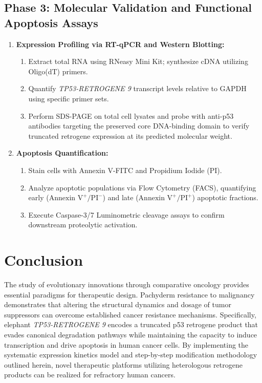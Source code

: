 \documentclass[12pt]{article}
\begin{document}
\subsection{Phase 3: Molecular Validation and Functional Apoptosis Assays}
\begin{enumerate}
    \item \textbf{Expression Profiling via RT-qPCR and Western Blotting:}
        \begin{enumerate}
            \item Extract total RNA using RNeasy Mini Kit; synthesize cDNA utilizing Oligo(dT) primers.
            \item Quantify \textit{TP53-RETROGENE 9} transcript levels relative to GAPDH using specific primer sets.
            \item Perform SDS-PAGE on total cell lysates and probe with anti-p53 antibodies targeting the preserved core DNA-binding domain to verify truncated retrogene expression at its predicted molecular weight.
        \end{enumerate}
    \item \textbf{Apoptosis Quantification:}
        \begin{enumerate}
            \item Stain cells with Annexin V-FITC and Propidium Iodide (PI).
            \item Analyze apoptotic populations via Flow Cytometry (FACS), quantifying early ($\text{Annexin V}^+/\text{PI}^-$) and late ($\text{Annexin V}^+/\text{PI}^+$) apoptotic fractions.
            \item Execute Caspase-3/7 Luminometric cleavage assays to confirm downstream proteolytic activation.
        \end{enumerate}
\end{enumerate}

\section{Conclusion}

The study of evolutionary innovations through comparative oncology provides essential paradigms for therapeutic design. Pachyderm resistance to malignancy demonstrates that altering the structural dynamics and dosage of tumor suppressors can overcome established cancer resistance mechanisms. Specifically, elephant \textit{TP53-RETROGENE 9} encodes a truncated p53 retrogene product that evades canonical degradation pathways while maintaining the capacity to induce transcription and drive apoptosis in human cancer cells. By implementing the systematic expression kinetics model and step-by-step modification methodology outlined herein, novel therapeutic platforms utilizing heterologous retrogene products can be realized for refractory human cancers.
\end{document}
